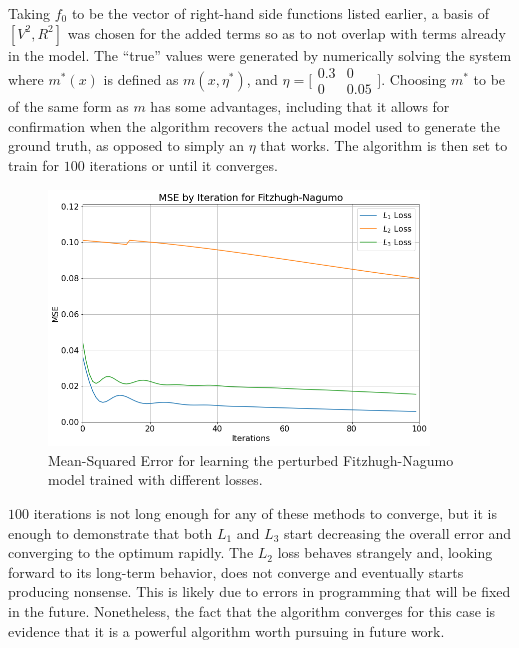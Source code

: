 \documentclass[12pt]{article}
\begin{document}
Taking $f_0$ to be the vector of right-hand side functions listed earlier, a basis of $[V^2, R^2]$ was chosen for the added terms so as to not overlap with terms already in the model. The ``true'' values were generated by numerically solving the system where $m^*(x)$ is defined as $m(x,\eta^*)$, and
$\eta = \big[\begin{smallmatrix}
  0.3 & 0\\
  0   & 0.05
  \end{smallmatrix}\big].$
Choosing $m^*$ to be of the same form as $m$ has some advantages, including that it allows for confirmation when the algorithm recovers the actual model used to generate the ground truth, as opposed to simply an $\eta$ that works. The algorithm is then set to train for $100$ iterations or until it converges.


\begin{figure}[ht]
  \centering
  \includegraphics[width=0.9\textwidth]{mse-fn.png}
  \caption{Mean-Squared Error for learning the perturbed Fitzhugh-Nagumo model trained with different losses.}
\end{figure}

$100$ iterations is not long enough for any of these methods to converge, but it is enough to demonstrate that both $L_1$ and $L_3$ start decreasing the overall error and converging to the optimum rapidly. The $L_2$ loss behaves strangely and, looking forward to its long-term behavior, does not converge and eventually starts producing nonsense. This is likely due to errors in programming that will be fixed in the future. Nonetheless, the fact that the algorithm converges for this case is evidence that it is a powerful algorithm worth pursuing in future work.
\end{document}
